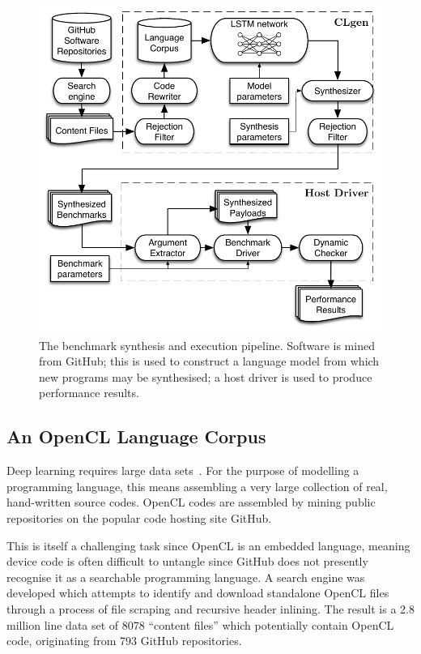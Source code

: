 \begin{figure}
	\centering%
	\includegraphics[width=\columnwidth]{img/pipeline}%
	\caption[Benchmark synthesis and execution pipeline]{The benchmark synthesis and execution pipeline. Software is mined from GitHub; this is used to construct a language model from which new programs may be synthesised; a host driver is used to produce performance results.}%
	\label{fig:clgen-pipeline}
\end{figure}

\subsection{An OpenCL Language Corpus}
\label{subsec:opencl-lang-corpus}

Deep learning requires large data sets~\cite{LeCun2015}. For the purpose of modelling a programming language, this means assembling a very large collection of real, hand-written source codes. OpenCL codes are assembled by mining public repositories on the popular code hosting site GitHub.

This is itself a challenging task since OpenCL is an embedded language, meaning device code is often difficult to untangle since GitHub does not presently recognise it as a searchable programming language. A search engine was developed which attempts to identify and download standalone OpenCL files through a process of file scraping and recursive header inlining. The result is a 2.8 million line data set of 8078 ``content files'' which potentially contain OpenCL code, originating from 793 GitHub repositories.

